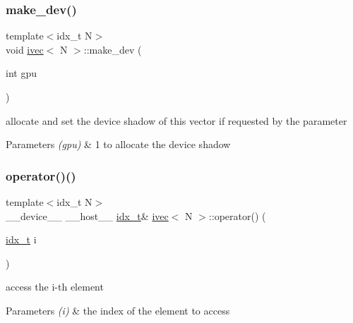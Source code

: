 \subsubsection{\texorpdfstring{make\+\_\+dev()}{make\_dev()}}
{\footnotesize\ttfamily template$<$idx\+\_\+t N$>$ \\
void \hyperlink{structivec}{ivec}$<$ N $>$\+::make\+\_\+dev (\begin{DoxyParamCaption}\item[{int}]{gpu }\end{DoxyParamCaption})\hspace{0.3cm}{\ttfamily [inline]}}



allocate and set the device shadow of this vector if requested by the parameter 


\begin{DoxyParams}{Parameters}
{\em (gpu)} & 1 to allocate the device shadow \\
\hline
\end{DoxyParams}
\mbox{\label{structivec_a54625e9b81da8a7aa7756e84a5f79e6f}} 
\subsubsection{\texorpdfstring{operator()()}{operator()()}}
{\footnotesize\ttfamily template$<$idx\+\_\+t N$>$ \\
\+\_\+\+\_\+device\+\_\+\+\_\+ \+\_\+\+\_\+host\+\_\+\+\_\+ \hyperlink{vgg__util_8h_a8e93478a00e685bea5e6a3f617bf03a3}{idx\+\_\+t}\& \hyperlink{structivec}{ivec}$<$ N $>$\+::operator() (\begin{DoxyParamCaption}\item[{\hyperlink{vgg__util_8h_a8e93478a00e685bea5e6a3f617bf03a3}{idx\+\_\+t}}]{i }\end{DoxyParamCaption})\hspace{0.3cm}{\ttfamily [inline]}}



access the i-\/th element 


\begin{DoxyParams}{Parameters}
{\em (i)} & the index of the element to access \\
\hline
\end{DoxyParams}
\mbox{\label{structivec_abe2b4ca3bb19444a5a915676aa333008}} 
